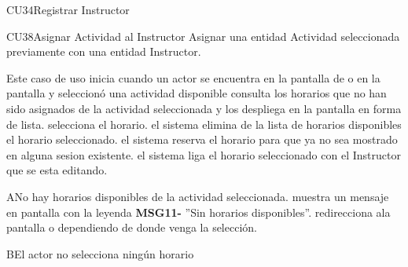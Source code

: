 \begin{UseCase}{CU34}{Registrar Instructor}
{%
\begin{UseCase}{CU38}{Asignar Actividad al Instructor}{
	Asignar una entidad Actividad seleccionada previamente con una entidad Instructor.
	}
	
\end{UseCase}
\begin{UCtrayectoria}{Este caso de uso inicia cuando un actor se encuentra en la pantalla de  o en la pantalla   y seleccionó una actividad disponible}
	\UCpaso consulta los horarios que no han sido asignados de la actividad seleccionada y los despliega en la pantalla en forma de lista.
	\UCpaso[\UCactor] selecciona el horario.
	\UCpaso el sistema elimina de la lista de horarios disponibles el horario seleccionado.
	\UCpaso el sistema reserva el horario para que ya no sea mostrado en alguna sesion existente.
	\UCpaso el sistema liga el horario seleccionado con el Instructor que se esta editando.
\end{UCtrayectoria}

\begin{UCtrayectoriaA}{A}{No hay horarios disponibles de la actividad seleccionada.}
	\UCpaso muestra un mensaje en pantalla con la leyenda {\bf MSG11-} ''Sin horarios disponibles''.
	\UCpaso redirecciona ala pantalla  o   dependiendo de donde venga la selección.
\end{UCtrayectoriaA}
\begin{UCtrayectoriaA}{B}{El actor no selecciona ningún horario}


\end{UCtrayectoriaA}}
\end{UseCase}
